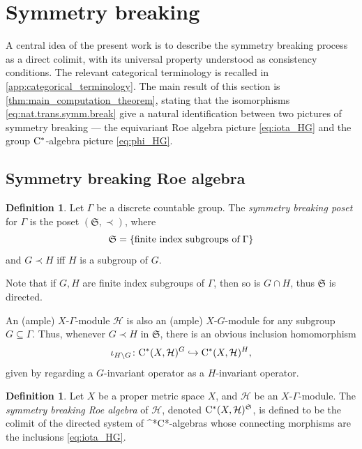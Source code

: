\documentclass{amsart}
\numberwithin{figure}{section}
\numberwithin{equation}{section}
\numberwithin{table}{section}
\theoremstyle{plain}
\theoremstyle{definition}
\newtheorem{definition}[equation]{Definition}
\theoremstyle{remark}
\theoremstyle{nonumber}
\newcommand{\Cst}{\relax\ifmmode\mathrm{C}^*\else\textup{C*}\fi}
\DeclarePairedDelimiter{\set}{\lbrace}{\rbrace} %
\begin{document}
\section{Symmetry breaking}\label{sec:symmetry_breaking}
A central idea of the present work is to describe the symmetry breaking
process as a direct colimit, with its universal property understood as
consistency conditions.
The relevant categorical terminology is recalled in
\cref{app:categorical_terminology}.
The main result of this section is \cref{thm:main_computation_theorem}, stating that the isomorphisms \eqref{eq:nat.trans.symm.break} give a natural identification between two pictures of symmetry breaking --- the equivariant Roe algebra picture \eqref{eq:iota_HG} and the group $\Cst$-algebra picture \eqref{eq:phi_HG}.

\subsection{Symmetry breaking Roe algebra}
\begin{definition}
Let $\Gamma$ be a discrete countable group. The \emph{symmetry breaking
poset} for $\Gamma$ is the poset \( (\mathfrak{S},\prec) \), where 
\[ 
    \mathfrak{S}=\set{\text{finite index subgroups of}\;\Gamma}
\]
and \( G\prec H \) iff \( H \) is a subgroup of \( G \).    
\end{definition}

Note that if $G,H$ are finite index subgroups of $\Gamma$, then so is
$G\cap H$, thus $\mathfrak{S}$ is directed. 

An (ample) $X$-$\Gamma$-module \( \mathcal{H} \) is also an (ample)
$X$-$G$-module for any subgroup $G\subseteq \Gamma$. Thus, whenever $G\prec H$ in $\mathfrak{S}$, there is an obvious inclusion homomorphism
\begin{equation}\label{eq:iota_HG}
\iota_{H\backslash G}\colon\Cst(X,\mathcal{H})^{G}
\hookrightarrow\Cst(X,\mathcal{H})^{H},
\end{equation} 
given by regarding a $G$-invariant operator as
a $H$-invariant operator.

\begin{definition}\label{DfnSymmBreakingAlg}
Let $X$ be a proper metric space $X$, and \( \mathcal{H} \) be an \( X
\)-\( \Gamma \)-module.  
The \emph{symmetry breaking Roe algebra} of \( \mathcal{H} \), 
denoted $\Cst(X,\mathcal{H})^\mathfrak{S}$,
is defined to be the colimit of the directed system of \Cst-algebras whose
connecting morphisms are the inclusions \eqref{eq:iota_HG}.
\end{definition}
\end{document}
